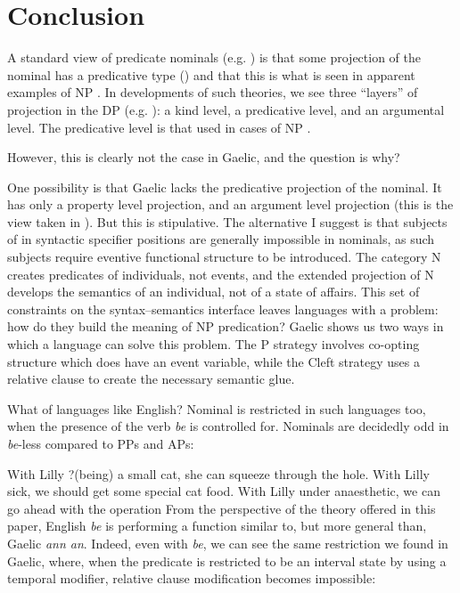 \documentclass[output=paper]{langsci/langscibook}
\begin{document}
\section{Conclusion}

A standard view of predicate nominals (e.g.
\citealt{partee:87,Higginbotham:1987}) is that some projection of the nominal
has a predicative type () and that this is what is seen in apparent
examples of NP . In developments of such theories, we see
three ``layers'' of projection in the DP (e.g. \citealt{zamparelli}): a kind
level, a predicative level, and an argumental level. The predicative level is
that used in cases of NP .

However, this is clearly not the case in Gaelic, and the question is why?

One possibility is that Gaelic lacks the predicative projection of the nominal.
It has only a property level projection, and an argument level projection (this
is the view taken in \citealt{adger-ramchand:03}). But this is stipulative. The
alternative I suggest is that subjects of  in syntactic specifier
positions are generally impossible in nominals, as such subjects require
eventive functional structure to be introduced. The category N creates
predicates of individuals, not events, and the extended projection of N
develops the semantics of an individual, not of a state of affairs. This set of
constraints on the syntax--semantics interface leaves languages with a problem:
how do they build the meaning of NP predication? Gaelic shows us two ways in
which a language can solve this problem. The P strategy involves co-opting
structure which does have an event variable, while the Cleft strategy uses a
relative clause to create the necessary semantic glue.

What of languages like English? Nominal  is restricted in such
languages too, when the presence of the verb \emph{be} is controlled for.
Nominals are decidedly odd in \emph{be}-less  compared to PPs
and APs:

\ea
    \ea With Lilly ?(being) a small cat, she can squeeze through the hole.
    \ex With Lilly sick, we should get some special cat food.
    \ex With Lilly under anaesthetic, we can go ahead with the operation
    \z
\z
From the perspective of the theory offered in this paper, English \emph{be} is
performing a function similar to, but more general than, Gaelic \emph{ann an}.
Indeed, even with \emph{be}, we can see the same restriction we found in
Gaelic, where, when the predicate is restricted to be an interval state by
using a temporal modifier, relative clause modification becomes impossible:
\end{document}

